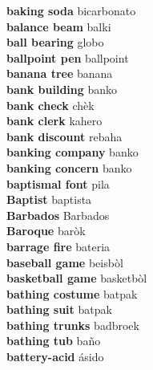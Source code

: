 \textbf{ baking soda  } bicarbonato \\
\textbf{ balance beam  } balki \\
\textbf{ ball bearing  } globo \\
\textbf{ ballpoint pen  } ballpoint \\
\textbf{ banana tree  } banana \\
\textbf{ bank building  } banko \\
\textbf{ bank check  } chèk \\
\textbf{ bank clerk  } kahero \\
\textbf{ bank discount  } rebaha \\
\textbf{ banking company  } banko \\
\textbf{ banking concern  } banko \\
\textbf{ baptismal font  } pila \\
\textbf{ Baptist  } baptista \\
\textbf{ Barbados  } Barbados \\
\textbf{ Baroque  } baròk \\
\textbf{ barrage fire  } bateria \\
\textbf{ baseball game  } beisbòl \\
\textbf{ basketball game  } basketbòl \\
\textbf{ bathing costume  } batpak \\
\textbf{ bathing suit  } batpak \\
\textbf{ bathing trunks  } badbroek \\
\textbf{ bathing tub  } baño \\
\textbf{ battery-acid  } ásido \\
